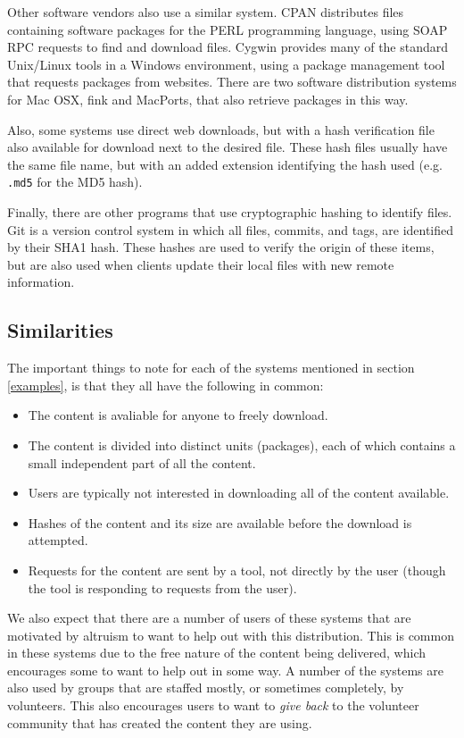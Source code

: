 \documentclass[conference]{IEEEtran}
\begin{document}
Other software vendors also use a similar system. CPAN \cite{cpan}
distributes files containing software packages for the PERL
programming language, using SOAP RPC requests to find and download
files. Cygwin \cite{cygwin} provides many of the
standard Unix/Linux tools in a Windows environment, using a
package management tool that requests packages from websites. There
are two software distribution systems for Mac OSX, fink and
MacPorts, that also retrieve packages in this way.

Also, some systems use direct web downloads, but with a hash
verification file also available for download next to the desired
file. These hash files usually have the same file name, but with an
added extension identifying the hash used (e.g. \texttt{.md5} for
the MD5 hash).

Finally, there are other programs that use cryptographic hashing to
identify files. Git is a version control system in which all files,
commits, and tags, are identified by their SHA1 hash. These hashes
are used to verify the origin of these items, but are also used when
clients update their local files with new remote information.

\subsection{Similarities}
\label{similarities}

The important things to note for each of the systems mentioned in
section \ref{examples}, is that they all have the following in
common:
\begin{itemize}
 \item The content is avaliable for anyone to freely download.
 \item The content is divided into distinct units (packages), each of which contains
       a small independent part of all the content.
 \item Users are typically not interested in downloading all of the content
       available.
 \item Hashes of the content and its size are available before the
       download is attempted.
 \item Requests for the content are sent by a tool, not directly by
       the user (though the tool is responding to requests from the user).
\end{itemize}

We also expect that there are a number of users of these systems
that are motivated by altruism to want to help out with this
distribution. This is common in these systems due to the free nature
of the content being delivered, which encourages some to want to
help out in some way. A number of the systems are also used by
groups that are staffed mostly, or sometimes completely, by
volunteers. This also encourages users to want to \emph{give back}
to the volunteer community that has created the content they are
using.
\end{document}
